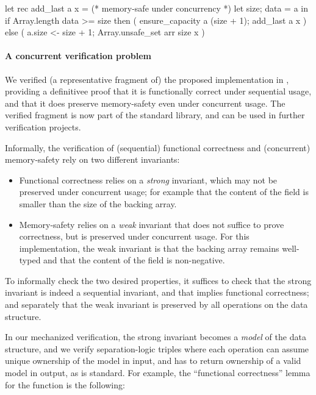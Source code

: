 \begin{ocamlcode}
let rec add_last a x = (* memory-safe under concurrency *)
  let {size; data} = a in
  if Array.length data >= size
  then ( ensure_capacity a (size + 1); add_last a x )
  else ( a.size <- size + 1; Array.unsafe_set arr size x )
\end{ocamlcode}

\paragraph{A concurrent verification problem} We verified (a representative fragment of) the proposed  implementation in \ZooLang, providing a definitivee proof that it is functionally correct under sequential usage, and that it does preserve memory-safety even under concurrent usage. The verified fragment is now part of the \Zoo standard library, and can be used in further verification projects.

Informally, the verification of (sequential) functional correctness and (concurrent) memory-safety rely on two different invariants:
\begin{itemize}
\item Functional correctness relies on a \emph{strong} invariant,
  which may not be preserved under concurrent usage; for example that
  the content of the  field is smaller than the
  size of the backing array.
\item Memory-safety relies on a \emph{weak} invariant that does not
  suffice to prove correctness, but is preserved under concurrent
  usage. For this  implementation, the weak
  invariant is that the backing array remains well-typed and that the
  content of the  field is non-negative.
\end{itemize}
To informally check the two desired properties, it suffices to check
that the strong invariant is indeed a sequential invariant, and that
implies functional correctness; and separately that the weak invariant
is preserved by all operations on the data structure.

In our mechanized verification, the strong invariant becomes a \emph{model}
of the data structure, and we verify separation-logic triples where
each operation can assume unique ownership of the model in input, and
has to return ownership of a valid model in output, as is
standard. For example, the ``functional correctness'' lemma for the
 function is the following:

